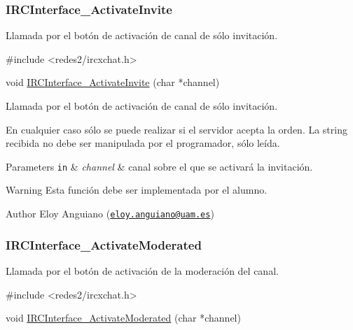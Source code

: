  \hypertarget{IRCInterface_ActivateInvite}{}\subsubsection{I\-R\-C\-Interface\-\_\-\-Activate\-Invite}\label{IRCInterface_ActivateInvite}
Llamada por el botón de activación de canal de sólo invitación.


\begin{DoxyCode}
\textcolor{preprocessor}{#include <redes2/ircxchat.h>}

\textcolor{keywordtype}{void} \hyperlink{xchat2_8c_ac72762ab1e3575b421b967241db23f9c}{IRCInterface\_ActivateInvite} (\textcolor{keywordtype}{char} *channel)
\end{DoxyCode}


Llamada por el botón de activación de canal de sólo invitación.

En cualquier caso sólo se puede realizar si el servidor acepta la orden. La string recibida no debe ser manipulada por el programador, sólo leída.


\begin{DoxyParams}[1]{Parameters}
\mbox{\tt in}  & {\em channel} & canal sobre el que se activará la invitación.\\
\hline
\end{DoxyParams}
\begin{DoxyWarning}{Warning}
Esta función debe ser implementada por el alumno.
\end{DoxyWarning}
\begin{DoxyAuthor}{Author}
Eloy Anguiano (\href{mailto:eloy.anguiano@uam.es}{\tt eloy.\-anguiano@uam.\-es})
\end{DoxyAuthor}


 \hypertarget{IRCInterface_ActivateModerated}{}\subsubsection{I\-R\-C\-Interface\-\_\-\-Activate\-Moderated}\label{IRCInterface_ActivateModerated}
Llamada por el botón de activación de la moderación del canal.


\begin{DoxyCode}
\textcolor{preprocessor}{#include <redes2/ircxchat.h>}

\textcolor{keywordtype}{void} \hyperlink{xchat2_8c_af83498f4058311f4562c43a9b70566b2}{IRCInterface\_ActivateModerated} (\textcolor{keywordtype}{char} *channel)
\end{DoxyCode}


